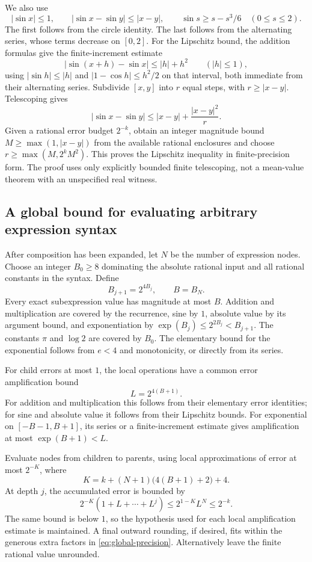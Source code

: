 We also use
\begin{equation}\label{eq:sine-basic-bounds}
 |\sin x|\le1,\qquad
 |\sin x-\sin y|\le|x-y|,\qquad
 \sin s\ge s-s^3/6\quad(0\le s\le2).
\end{equation}
The first follows from the circle identity. The last follows from the
alternating series, whose terms decrease on $[0,2]$. For the Lipschitz
bound, the addition formulas give the finite-increment estimate
\[
 |\sin(x+h)-\sin x|\le |h|+h^2
 \qquad(|h|\le1),
\]
using $|\sin h|\le|h|$ and $|1-\cos h|\le h^2/2$ on that interval,
both immediate from their alternating series. Subdivide $[x,y]$ into
$r$ equal steps, with $r\ge|x-y|$. Telescoping gives
\[
 |\sin x-\sin y|\le |x-y|+\frac{|x-y|^2}{r}.
\]
Given a rational error budget $2^{-k}$, obtain an integer magnitude bound
$M\ge\max(1,|x-y|)$ from the available rational enclosures and choose
$r\ge\max(M,2^kM^2)$. This proves the Lipschitz inequality in
finite-precision form. The proof uses only explicitly bounded finite
telescoping, not a mean-value theorem with an unspecified real witness.

\subsection{A global bound for evaluating arbitrary expression syntax}

After composition has been expanded, let $N$ be the number of expression
nodes. Choose an integer $B_0\ge8$ dominating the absolute rational input
and all rational constants in the syntax. Define
\[
 B_{j+1}=2^{4B_j},\qquad B=B_N.
\]
Every exact subexpression value has magnitude at most $B$. Addition and
multiplication are covered by the recurrence, sine by $1$, absolute value
by its argument bound, and exponentiation by
$\exp(B_j)\le 2^{2B_j}<B_{j+1}$. The constants $\pi$ and $\log2$ are
covered by $B_0$. The elementary bound for the exponential follows from
$e<4$ and monotonicity, or directly from its series.

For child errors at most $1$, the local operations have a common error
amplification bound
\[
 L=2^{4(B+1)}.
\]
For addition and multiplication this follows from their elementary error
identities; for sine and absolute value it follows from their Lipschitz
bounds. For exponential on $[-B-1,B+1]$, its series or a finite-increment
estimate gives amplification at most $\exp(B+1)<L$.

Evaluate nodes from children to parents, using local approximations of
error at most $2^{-K}$, where
\begin{equation}\label{eq:global-precision}
 K=k+(N+1)\bigl(4(B+1)+2\bigr)+4.
\end{equation}
At depth $j$, the accumulated error is bounded by
\[
 2^{-K}(1+L+\cdots+L^j)\le2^{1-K}L^N\le2^{-k}.
\]
The same bound is below $1$, so the hypothesis used for each local
amplification estimate is maintained. A final outward rounding, if
desired, fits within the generous extra factors in
\eqref{eq:global-precision}. Alternatively leave the finite rational
value unrounded.

